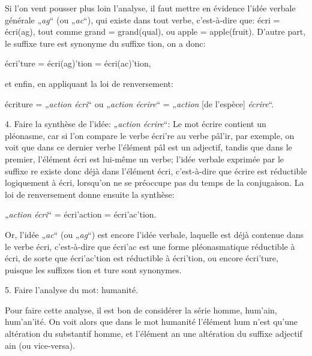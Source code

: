 {    Si l’on vent pousser plus loin l’analyse, il faut mettre en
    évidence l’idée verbale générale „\emph{ag}“ (ou „\emph{ac}“), qui
    existe dans tout verbe, c’est-à-dire que: \textup{écri} =
    \textup{écri(ag)}, tout comme \textup{grand} =
    \textup{grand(qual)}, ou \textup{apple} =
    \textup{apple(fruit)}. D’autre part, le suffixe \textup{ture} est synonyme
    du suffixe \textup{tion}, on a donc:

    {\centering
      \textup{écri'ture} = \textup{écri(ag)'tion} =
      \textup{écri(ac)'tion},\par
    }

    \noindent
    et enfin, en appliquant la loi de renversement:
    
    \noindent
    {\centering
      \textup{écriture} = „\emph{action écri}“ ou „\emph{action écrire}“
      = „\emph{action} [de l’espèce] \emph{écrire}“.\par
    }

    4. Faire la synthèse de l’idée: „\emph{action écrire}“: Le mot
    \textup{écrire} contient un pléonasme, car si l’on compare le
    verbe \textup{écri're} au verbe \textup{pâl'ir}, par exemple, on
    voit que dans ce dernier verbe l’élément \textup{pâl} est un
    adjectif, tandis que dans le premier, l’élément \textup{écri} est
    lui-même un verbe; l’idée verbale exprimée par le suffixe
    \textup{re} existe donc déjà dans l’élément \textup{écri},
    c’est-à-dire que \textup{écrire} est réductible logiquement à
    \textup{écri}, lorsqu’on ne se préoccupe pas du temps de la
    conjugaison. La loi de renversement donne ensuite la synthèse:

    {\centering
      „\emph{action écri}“ = \textup{écri'action} =
      \textup{écri'ac’tion}.\par
    }

    Or, l’idée „\emph{ac}“ (ou „\emph{ag}“) est encore l’idée verbale,
    laquelle est déjà contenue dans le verbe \textup{écri},
    c’est-à-dire que \textup{écri'ac} est une forme pléonasmatique
    réductible à \textup{écri}, de sorte que \textup{écri'ac'tion} est
    réductible à \textup{écri'tion}, ou encore \textup{écri'ture},
    puisque les suffixes \textup{tion} et \textup{ture} sont
    synonymes.

    5. Faire l’analyse du mot: \textup{humanité}.

    Pour faire cette analyse, il est bon de considérer la série
    \textup{homme}, \textup{hum'ain}, \textup{hum'an'ité}. On voit
    alors que dans le mot \textup{humanité} l’élément \textup{hum}
    n’est qu’une altération du substantif \textup{homme}, et l’élément
    \textup{an} une altération du suffixe adjectif \textup{ain} (ou
    vice-versa).

}
